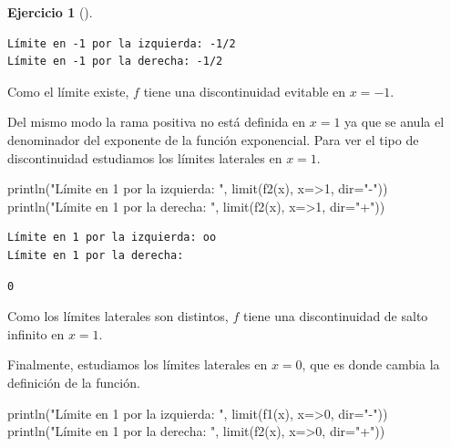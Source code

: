 \documentclass[
  a4paper,
]{scrreport}
\newenvironment{Shaded}{\begin{snugshade}}{\end{snugshade}}
\newcommand{\FloatTok}[1]{\textcolor[rgb]{0.68,0.00,0.00}{#1}}
\newcommand{\FunctionTok}[1]{\textcolor[rgb]{0.28,0.35,0.67}{#1}}
\newcommand{\NormalTok}[1]{\textcolor[rgb]{0.00,0.23,0.31}{#1}}
\newcommand{\OperatorTok}[1]{\textcolor[rgb]{0.37,0.37,0.37}{#1}}
\newcommand{\StringTok}[1]{\textcolor[rgb]{0.13,0.47,0.30}{#1}}
\theoremstyle{definition}
\newtheorem{exercise}{Ejercicio}[chapter]
\theoremstyle{remark}
\begin{document}
\begin{exercise}[]
\begin{tcolorbox}
\begin{verbatim}
Límite en -1 por la izquierda: -1/2
Límite en -1 por la derecha: -1/2
\end{verbatim}

Como el límite existe, \(f\) tiene una discontinuidad evitable en
\(x=-1\).

Del mismo modo la rama positiva no está definida en \(x=1\) ya que se
anula el denominador del exponente de la función exponencial. Para ver
el tipo de discontinuidad estudiamos los límites laterales en \(x=1\).

\begin{Shaded}
\begin{Highlighting}[]
\FunctionTok{println}\NormalTok{(}\StringTok{"Límite en 1 por la izquierda: "}\NormalTok{, }\FunctionTok{limit}\NormalTok{(}\FunctionTok{f2}\NormalTok{(x), x}\OperatorTok{=\textgreater{}}\FloatTok{1}\NormalTok{, dir}\OperatorTok{=}\StringTok{"{-}"}\NormalTok{))}
\FunctionTok{println}\NormalTok{(}\StringTok{"Límite en 1 por la derecha: "}\NormalTok{, }\FunctionTok{limit}\NormalTok{(}\FunctionTok{f2}\NormalTok{(x), x}\OperatorTok{=\textgreater{}}\FloatTok{1}\NormalTok{, dir}\OperatorTok{=}\StringTok{"+"}\NormalTok{))}
\end{Highlighting}
\end{Shaded}

\begin{verbatim}
Límite en 1 por la izquierda: oo
Límite en 1 por la derecha: 
\end{verbatim}

\begin{verbatim}
0
\end{verbatim}

Como los límites laterales son distintos, \(f\) tiene una discontinuidad
de salto infinito en \(x=1\).

Finalmente, estudiamos los límites laterales en \(x=0\), que es donde
cambia la definición de la función.

\begin{Shaded}
\begin{Highlighting}[]
\FunctionTok{println}\NormalTok{(}\StringTok{"Límite en 1 por la izquierda: "}\NormalTok{, }\FunctionTok{limit}\NormalTok{(}\FunctionTok{f1}\NormalTok{(x), x}\OperatorTok{=\textgreater{}}\FloatTok{0}\NormalTok{, dir}\OperatorTok{=}\StringTok{"{-}"}\NormalTok{))}
\FunctionTok{println}\NormalTok{(}\StringTok{"Límite en 1 por la derecha: "}\NormalTok{, }\FunctionTok{limit}\NormalTok{(}\FunctionTok{f2}\NormalTok{(x), x}\OperatorTok{=\textgreater{}}\FloatTok{0}\NormalTok{, dir}\OperatorTok{=}\StringTok{"+"}\NormalTok{))}
\end{Highlighting}
\end{Shaded}


\end{tcolorbox}
\end{exercise}
\end{document}
